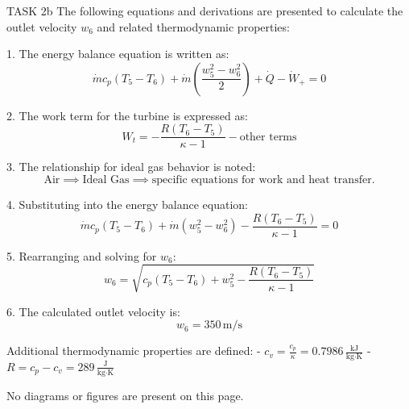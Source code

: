 TASK 2b  
The following equations and derivations are presented to calculate the outlet velocity \( w_6 \) and related thermodynamic properties:

1. The energy balance equation is written as:  
\[
\dot{m} c_p (T_5 - T_6) + \dot{m} \left( \frac{w_5^2 - w_6^2}{2} \right) + \dot{Q} - \dot{W}_+ = 0
\]

2. The work term for the turbine is expressed as:  
\[
W_t = -\frac{R (T_6 - T_5)}{\kappa - 1} - \text{other terms}
\]

3. The relationship for ideal gas behavior is noted:  
\[
\text{Air} \implies \text{Ideal Gas} \implies \text{specific equations for work and heat transfer.}
\]

4. Substituting into the energy balance equation:  
\[
\dot{m} c_p (T_5 - T_6) + \dot{m} (w_5^2 - w_6^2) - \frac{R (T_6 - T_5)}{\kappa - 1} = 0
\]

5. Rearranging and solving for \( w_6 \):  
\[
w_6 = \sqrt{c_p (T_5 - T_6) + w_5^2 - \frac{R (T_6 - T_5)}{\kappa - 1}}
\]

6. The calculated outlet velocity is:  
\[
w_6 = 350 \, \text{m/s}
\]

Additional thermodynamic properties are defined:  
- \( c_v = \frac{c_p}{\kappa} = 0.7986 \, \frac{\text{kJ}}{\text{kg·K}} \)  
- \( R = c_p - c_v = 289 \, \frac{\text{J}}{\text{kg·K}} \)

No diagrams or figures are present on this page.